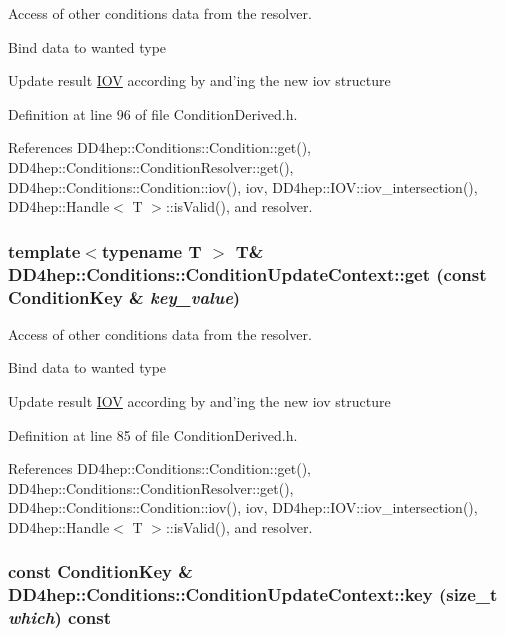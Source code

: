 Access of other conditions data from the resolver. 

Bind data to wanted type

Update result \hyperlink{class_d_d4hep_1_1_i_o_v}{IOV} according by and'ing the new iov structure 

Definition at line 96 of file ConditionDerived.h.

References DD4hep::Conditions::Condition::get(), DD4hep::Conditions::ConditionResolver::get(), DD4hep::Conditions::Condition::iov(), iov, DD4hep::IOV::iov\_\-intersection(), DD4hep::Handle$<$ T $>$::isValid(), and resolver.\hypertarget{class_d_d4hep_1_1_conditions_1_1_condition_update_context_a3c3196d5e62a01a41f6cab49aecb948e}{
\subsubsection[{get}]{\setlength{\rightskip}{0pt plus 5cm}template$<$typename T $>$ {\bf T}\& DD4hep::Conditions::ConditionUpdateContext::get (const {\bf ConditionKey} \& {\em key\_\-value})}}
\label{class_d_d4hep_1_1_conditions_1_1_condition_update_context_a3c3196d5e62a01a41f6cab49aecb948e}


Access of other conditions data from the resolver. 

Bind data to wanted type

Update result \hyperlink{class_d_d4hep_1_1_i_o_v}{IOV} according by and'ing the new iov structure 

Definition at line 85 of file ConditionDerived.h.

References DD4hep::Conditions::Condition::get(), DD4hep::Conditions::ConditionResolver::get(), DD4hep::Conditions::Condition::iov(), iov, DD4hep::IOV::iov\_\-intersection(), DD4hep::Handle$<$ T $>$::isValid(), and resolver.\hypertarget{class_d_d4hep_1_1_conditions_1_1_condition_update_context_abfbc982283941179b03a5dcd719d3acf}{
\subsubsection[{key}]{\setlength{\rightskip}{0pt plus 5cm}const {\bf ConditionKey} \& DD4hep::Conditions::ConditionUpdateContext::key (size\_\-t {\em which}) const}}
\label{class_d_d4hep_1_1_conditions_1_1_condition_update_context_abfbc982283941179b03a5dcd719d3acf}


